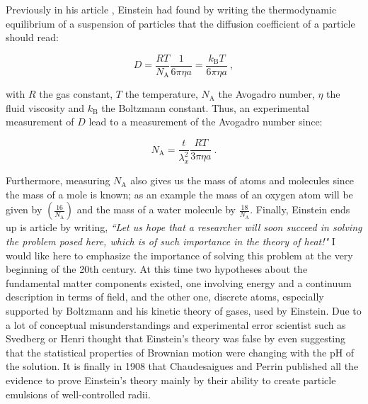 Previously in his article \cite{einstein_uber_1905}, Einstein had found by writing the thermodynamic equilibrium of a suspension of particles that the diffusion coefficient of a particle should read:

\begin{equation}
	D = \frac{R T}{N_\mathrm{A}}\frac{1}{6\pi \eta a} = \frac{k_\mathrm{B}T}{6 \pi \eta a}
	~,
	\label{Eq:D_einstein}
\end{equation}


with $R$ the gas constant, $T$ the temperature, $N_\mathrm{A}$ the Avogadro number, $\eta$ the fluid viscosity and $k_\mathrm{B}$ the Boltzmann constant. Thus, an experimental measurement of $D$ lead to a measurement of the Avogadro number since:

\begin{equation}
	N_\mathrm{A} = \frac{t}{\lambda_x^2} \frac{RT}{3\pi \eta a} ~.
\end{equation}

Furthermore, measuring $N_\mathrm{A}$ also gives us the mass of atoms and molecules since the mass of a mole is known; as an example the mass of an oxygen atom will be given by $\left(\frac{16}{N_\mathrm{A}}\right)$ and the mass of a water molecule by $\frac{18}{N_\mathrm{A}}$. Finally, Einstein ends up is article \cite{einstein_uber_1905} by writing, \textit{``Let us hope that a researcher will soon succeed in solving the problem posed here, which is of such importance in the theory of heat!"} I would like here to emphasize the importance of solving this problem at the very beginning of the 20th century. At this time two hypotheses about the fundamental matter components existed, one involving energy and a continuum description in terms of field, and the other one, discrete atoms, especially supported by Boltzmann and his kinetic theory of gases, used by Einstein. Due to a lot of conceptual misunderstandings and experimental error scientist such as Svedberg or Henri thought that Einstein's theory was false \cite{genthon_concept_2020} by even suggesting that the statistical properties of Brownian motion were changing with the pH of the solution. It is finally in 1908 that Chaudesaigues and Perrin published all the evidence to prove Einstein's theory mainly by their ability to create particle emulsions of well-controlled radii. 


